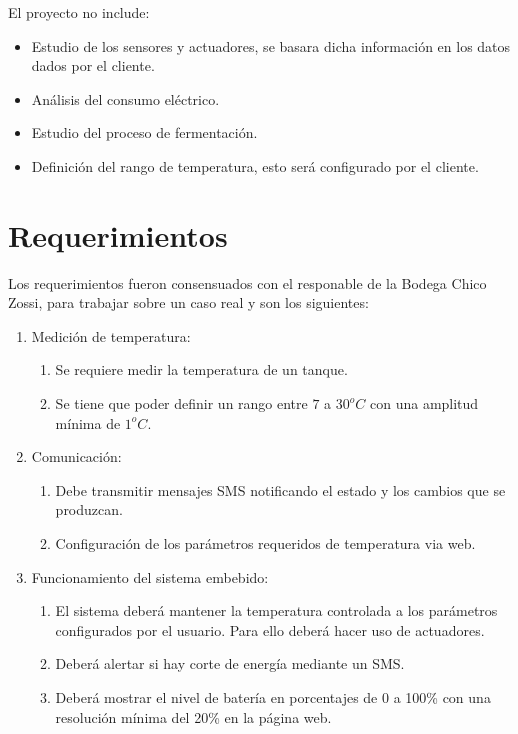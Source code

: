 El proyecto no include:
  \begin{itemize}
    \item Estudio de los sensores y actuadores, se basara dicha información en los datos dados por el cliente. 
    \item Análisis del consumo eléctrico.
    \item Estudio del proceso de fermentación.
    \item Definición del rango de temperatura, esto será configurado por el cliente.
  \end{itemize}

  \section{Requerimientos}

Los requerimientos fueron consensuados con el responable de la Bodega Chico Zossi, para trabajar sobre un caso real y son los siguientes:

\begin{enumerate}[label*=\arabic*.]
  \item Medición de temperatura:
    \begin{enumerate}[label*=\arabic*.]
      \item Se requiere medir la temperatura de un tanque.
      \item Se tiene que poder definir un rango entre $7$ a $30^oC$ con una amplitud mínima de $1^oC$.
    \end{enumerate}
  \item Comunicación:
    \begin{enumerate}[label*=\arabic*.]
      \item Debe transmitir mensajes SMS notificando el estado y los cambios que se produzcan.
      \item Configuración de los parámetros requeridos de temperatura via web. 
    \end{enumerate}
  \item Funcionamiento del sistema embebido:
    \begin{enumerate}[label*=\arabic*.]
      \item El sistema deberá mantener la temperatura controlada a los parámetros configurados por el usuario. Para ello deberá hacer uso de actuadores.
      \item Deberá alertar si hay corte de energía mediante un SMS.
      \item Deberá mostrar el nivel de batería en porcentajes de 0 a 100\%  con una resolución mínima del 20\% en la página web.
  \end{enumerate}
\end{enumerate}


